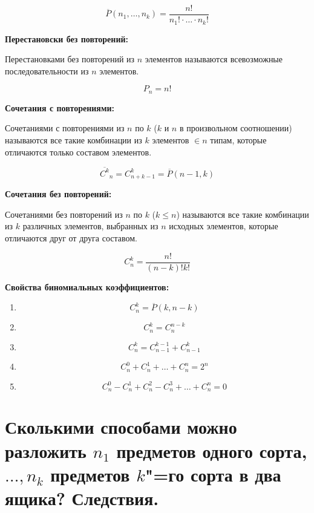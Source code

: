     \[
        \overline{P}(n_1, \dots, n_k) = \frac{n!}{n_1! \cdot \dots \cdot n_k!}  
    \]
    \bigskip

\textbf{Перестановски без повторений:}
    \smallskip
    
    Перестановками без повторений из $n$ элементов называются всевозможные
    последовательности из $n$ элементов.

    \[
        P_n = n!  
    \]
    \bigskip

\textbf{Сочетания с повторениями:}
    \smallskip
    
    Сочетаниями с повторениями из $n$ по $k$ ($k$ и $n$ в произвольном соотношении)
    называются все такие комбинации из $k$ элементов $\in n$ типам,
    которые отличаются только составом элементов.

    \[
        \overline{C^k}_n = C^k_{n + k - 1} = \overline{P}(n - 1, k) 
    \]
    \bigskip

\textbf{Сочетания без повторений:}
    \smallskip
    
    Сочетаниями без повторений из $n$ по $k$ ($k \leq n$) называются
    все такие комбинации из $k$ различных элементов, выбранных из
    $n$ исходных элементов, которые отличаются друг от друга составом.

    \[
        C^k_n = \frac{n!}{(n - k)! k!}  
    \]
    \bigskip

\textbf{Свойства биномиальных коэффициентов:}
    \smallskip
    
    \begin{enumerate}
        \item{
            \[
                C^k_n = \overline{P}(k, n - k)  
            \]
        }
        \item{
            \[
                C^k_n = C^{n - k}_n  
            \]
        }
        \item{
            \[
                C^k_n = C^{k - 1}_{n - 1} + C^{k}_{n - 1}  
            \]
        }
        \item{
            \[
                C^0_n + C^1_n + \dots + C^n_n = 2^n  
            \]
        }
        \item{
            \[
                C^0_n - C^1_n + C^2_n - C^3_n + \dots + C^n_n = 0  
            \]
        }
    \end{enumerate}

\section{Сколькими способами можно разложить $n_1$ предметов одного сорта,
$\dots, n_k$ предметов $k$"=го сорта в два ящика? Следствия.}

